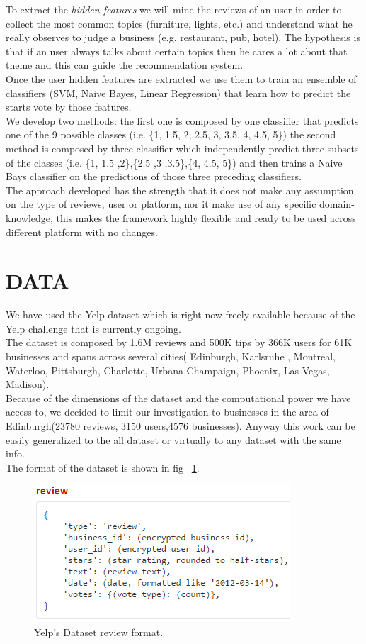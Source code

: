 \documentclass[a4paper, 10pt, conference]{ieeeconf}      %
\begin{document}
To extract the \textit{hidden-features} we will mine the reviews of an user in order to collect the most common topics (furniture, lights, etc.) and  understand what he really observes to judge a business (e.g. restaurant, pub, hotel).
The hypothesis is that if an user always talks about certain topics then he cares a lot about that theme and this can guide the recommendation system.\\
Once the user hidden features are extracted we use them to train an ensemble of classifiers (SVM, Naive Bayes, Linear Regression) that learn how to predict the starts vote by those features.\\
We develop two methods: the first one is composed by one classifier that predicts one of the 9 possible classes (i.e. \{1, 1.5, 2, 2.5, 3, 3.5, 4, 4.5, 5\}) the second method is composed by three classifier which independently predict three subsets of the classes (i.e. \{1, 1.5 ,2\},\{2.5 ,3 ,3.5\},\{4, 4.5, 5\}) and then trains a Naive Bays classifier on the predictions of those three preceding classifiers.\\
The approach developed has the strength that it does not make any assumption on the type of reviews, user or platform, nor it make use of any specific domain-knowledge, this makes the framework highly flexible and ready to be used across different platform with no changes.

\section{DATA}
We have used the Yelp dataset\cite{yelp} which is right now freely available because of the Yelp challenge that is currently ongoing.\\
The dataset is composed by 1.6M reviews and 500K tips by 366K users for 61K businesses and spans across several cities( Edinburgh, Karlsruhe
, Montreal, Waterloo, Pittsburgh, Charlotte, Urbana-Champaign, Phoenix, Las Vegas, Madison).\\
 Because of the dimensions of the dataset and the computational power we have access to, we decided to limit our investigation to businesses in the area of Edinburgh(23780 reviews, 3150 users,4576 businesses). Anyway this work can be easily generalized to the all dataset or virtually to any dataset with the same info.\\
 The format of the dataset is shown in fig ~\ref{review}.
 \begin{figure}[thpb]
 	\includegraphics[scale=0.75]{img/review.png}
 	\caption{Yelp's Dataset review format.}
 	\label{review}
 \end{figure}
\end{document}

